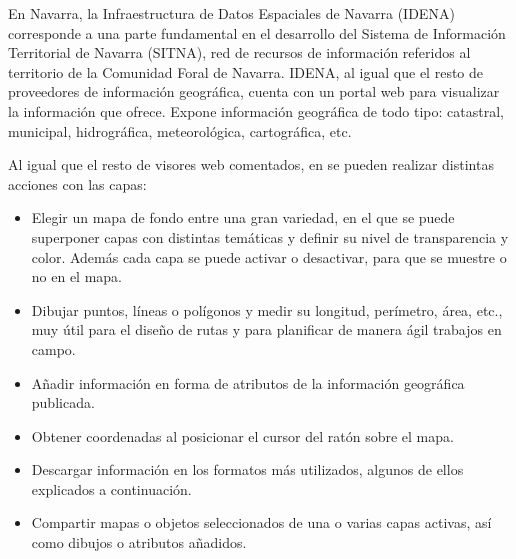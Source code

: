 En Navarra, la Infraestructura de Datos Espaciales de Navarra (IDENA) corresponde a una parte fundamental en el desarrollo del Sistema de Información Territorial de Navarra (SITNA),
red de recursos de información referidos al territorio de la Comunidad Foral de Navarra. 
IDENA, al igual que el resto de proveedores de información geográfica, cuenta con un portal web \cite{IDENA} para visualizar la información que ofrece.
Expone información geográfica de todo tipo: catastral, municipal, hidrográfica, meteorológica, cartográfica, etc.

Al igual que el resto de visores web comentados, en \cite{IDENA} se pueden realizar distintas acciones con las capas:
\begin{itemize}
\item Elegir un mapa de fondo entre una gran variedad, en el que se puede superponer capas con distintas temáticas y definir su nivel de transparencia y color.
Además cada capa se puede activar o desactivar, para que se muestre o no en el mapa.
\item Dibujar puntos, líneas o polígonos y medir su longitud, perímetro, área, etc., muy útil para el diseño de rutas y para planificar de manera ágil trabajos en campo.
\item Añadir información en forma de atributos de la información geográfica publicada.
\item Obtener coordenadas al posicionar el cursor del ratón sobre el mapa.
\item Descargar información en los formatos más utilizados, algunos de ellos explicados a continuación.
\item Compartir mapas o objetos seleccionados de una o varias capas activas, así como dibujos o atributos añadidos.
\end{itemize}


